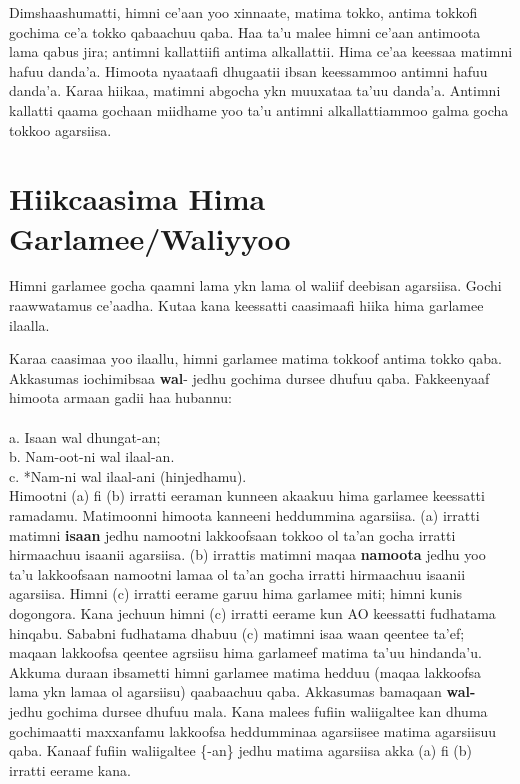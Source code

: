 \documentclass[11pt,b5paper]{book}
\begin{document}
Dimshaashumatti, himni ce’aan yoo xinnaate, matima tokko, antima tokkofi gochima ce’a tokko qabaachuu qaba. Haa ta’u malee himni ce’aan antimoota lama qabus jira; antimni kallattiifi antima alkallattii. Hima ce’aa keessaa matimni hafuu danda’a. Himoota nyaataafi dhugaatii ibsan keessammoo antimni hafuu danda’a. Karaa hiikaa, matimni abgocha ykn muuxataa ta’uu danda’a. Antimni kallatti qaama gochaan miidhame yoo ta’u antimni alkallattiammoo galma gocha tokkoo agarsiisa.

\section{Hiikcaasima Hima Garlamee/Waliyyoo}

Himni garlamee  gocha qaamni lama ykn lama ol waliif deebisan agarsiisa. Gochi raawwatamus ce’aadha. Kutaa kana keessatti caasimaafi hiika hima garlamee ilaalla. 

Karaa caasimaa yoo ilaallu, himni garlamee matima tokkoof antima tokko qaba. Akkasumas iochimibsaa \textbf{wal}- jedhu gochima dursee dhufuu qaba. Fakkeenyaaf himoota armaan gadii haa hubannu: \\
\\
a. Isaan wal dhungat-an; \\
b. Nam-oot-ni wal ilaal-an.\\
c. *Nam-ni wal ilaal-ani (hinjedhamu). \\

Himootni (a) fi (b) irratti eeraman kunneen akaakuu hima garlamee keessatti ramadamu. Matimoonni himoota kanneeni heddummina agarsiisa. (a) irratti matimni \textbf{isaan} jedhu namootni lakkoofsaan tokkoo ol ta’an gocha irratti hirmaachuu isaanii agarsiisa. (b) irrattis matimni maqaa \textbf{namoota} jedhu yoo ta’u lakkoofsaan namootni lamaa ol ta’an gocha irratti hirmaachuu isaanii agarsiisa. Himni (c) irratti eerame garuu hima garlamee miti; himni kunis dogongora. Kana jechuun himni
(c) irratti eerame kun AO keessatti fudhatama hinqabu. Sababni fudhatama dhabuu (c) matimni isaa waan qeentee ta’ef; maqaan lakkoofsa qeentee agrsiisu hima garlameef matima ta’uu hindanda’u. Akkuma duraan ibsametti himni garlamee matima hedduu (maqaa lakkoofsa lama ykn lamaa ol agarsiisu) qaabaachuu qaba. Akkasumas bamaqaan\textbf{ wal-} jedhu gochima dursee dhufuu mala. Kana malees fufiin waliigaltee
kan dhuma gochimaatti maxxanfamu lakkoofsa heddumminaa agarsiisee matima agarsiisuu qaba. Kanaaf fufiin waliigaltee \{-an\} jedhu matima agarsiisa akka (a) fi (b) irratti eerame kana.
\end{document}

